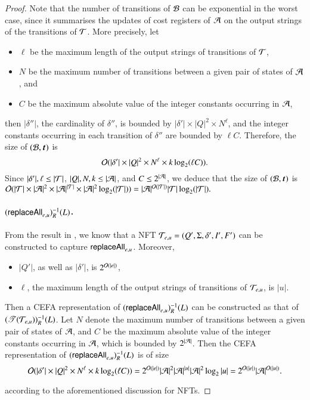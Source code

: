 \begin{proof}
Note that the number of transitions of $\mathcal{B}$ can be exponential in the worst case, since it summarises the updates of cost registers of $\mathcal{A}$ on the output strings of the transitions of $\mathcal{T}$. More precisely,  let
\begin{itemize}
\item $\ell$ be the maximum length of the output strings of transitions of $\mathcal{T}$, 
\item $N$ be the maximum number of transitions between a given pair of states of $\mathcal{A}$, and
\item  $C$ be the maximum absolute value of the integer constants occurring in $\mathcal{A}$,
\end{itemize}
then $|\delta''|$, the cardinality of $\delta''$, is bounded by $|\delta'| \times |Q|^2 \times N^\ell $, and the integer constants occurring in each transition of $\delta''$ are bounded by $\ell C$. Therefore, 
the size of $(\cB, \vec{t})$ is 
\[
\mathcal{O}(|\delta'| \times |Q|^2 \times N^\ell \times k \log_2 (\ell C)).
\] 
Since $|\delta'|, \ell \le |\mathcal{T}|$, $|Q|, N, k \le |\mathcal{A}|$, and $C \le 2^{|\mathcal{A}|}$, we deduce that the size of $(\cB, \vec{t})$ is 
$
\mathcal{O}( |\mathcal{T}| \times  |\mathcal{A}|^2 \times |\mathcal{A}|^{|\mathcal{T}|} \times |\mathcal{A}|^2 \log_2(|\mathcal{T}|))= |\mathcal{A}|^{\mathcal{O}(|\mathcal{T}|)} |\mathcal{T}| \log_2(|\mathcal{T}|).$
%

\paragraph*{$(\mathsf{replaceAll}_{e,u})^{-1}_R(L)$.}
%
From the result in \cite{CCH+18}, we know that  a NFT $\mathcal{T}_{e,u}=(Q', \Sigma, \delta', I', F')$ can be constructed to capture $\mathsf{replaceAll}_{e,u}$.  Moreover, 
\begin{itemize}
\item $|Q'|$, as well as $|\delta'|$, is $2^{\mathcal{O}(|e|)}$,
\item $\ell$, the maximum length of the output strings of transitions of $\mathcal{T}_{e,u}$, is $|u|$.
\end{itemize}
Then a CEFA representation of $(\mathsf{replaceAll}_{e,u})^{-1}_R(L)$ can be constructed as that of $(\mathscr{T}(\mathcal{T}_{e,u}))^{-1}_R(L)$.
Let $N$ denote the maximum number of transitions between a given pair of states of $\mathcal{A}$, and $C$ be the maximum absolute value of the integer constants occurring in $\mathcal{A}$, which is bounded by $2^{|\mathcal{A}|}$. Then the CEFA representation of $(\mathsf{replaceAll}_{e,u})^{-1}_R(L)$ is of size 
\[
\mathcal{O}(|\delta'| \times |Q|^2 \times N^\ell \times k \log_2 (\ell C)) = 2^{\mathcal{O}(|e|)} |\mathcal{A}|^2 |\mathcal{A}|^{|u|} |\mathcal{A}|^2 \log_2 |u|=2^{\mathcal{O}(|e|)} |\mathcal{A}|^{\mathcal{O}(|u|)}.
\]

%
 according to the aforementioned discussion for NFTs.
% 
%
\end{proof}

